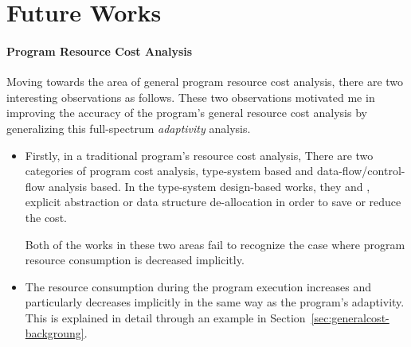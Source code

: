 
\section{Future Works}
\label{sec:intro-cfl}
\paragraph{Program Resource Cost Analysis}
\label{sec:intro-cost}
Moving towards the area of general program resource cost analysis,
there are two interesting observations as follows.
These two observations motivated me in 
improving the accuracy of the program's general resource cost analysis
by generalizing this full-spectrum \emph{adaptivity} analysis.
\begin{itemize}
 \item Firstly, in a traditional program's resource cost analysis,
 There are two categories of program cost analysis, type-system based and data-flow/control-flow analysis based. 
 In the type-system design-based works, they \cite{GustafssonEL05} and \cite{hoffmann_jost_2022}, explicit abstraction or data structure de-allocation in order to save or reduce the cost.
 
 Both of the
 works in these two areas fail to recognize the case where program resource consumption is decreased implicitly.
 \item The resource consumption during the program 
 execution increases and particularly decreases implicitly in the same way as the program's adaptivity. 
 This is explained in detail through an example in Section~\ref*{sec:generalcost-backgroung}.
\end{itemize}
